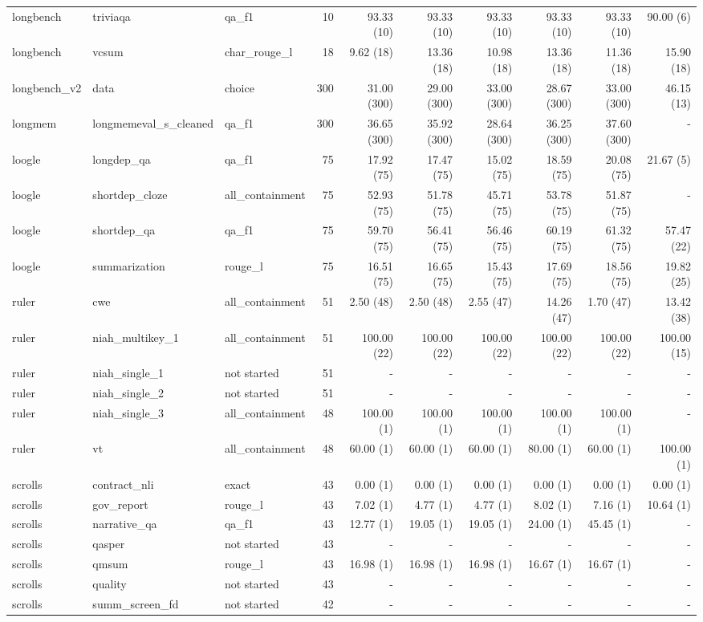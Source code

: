 \begin{landscape}
\begin{longtable}{@{}p{19mm}p{52mm}p{25mm}rrrrrrr@{}}
longbench & triviaqa & qa\_f1 & 10 & 93.33 (10) & 93.33 (10) & 93.33 (10) & 93.33 (10) & 93.33 (10) & 90.00 (6) \\
longbench & vcsum & char\_rouge\_l & 18 & 9.62 (18) & 13.36 (18) & 10.98 (18) & 13.36 (18) & 11.36 (18) & 15.90 (18) \\
longbench\_v2 & data & choice & 300 & 31.00 (300) & 29.00 (300) & 33.00 (300) & 28.67 (300) & 33.00 (300) & 46.15 (13) \\
longmem & longmemeval\_s\_cleaned & qa\_f1 & 300 & 36.65 (300) & 35.92 (300) & 28.64 (300) & 36.25 (300) & 37.60 (300) & - \\
loogle & longdep\_qa & qa\_f1 & 75 & 17.92 (75) & 17.47 (75) & 15.02 (75) & 18.59 (75) & 20.08 (75) & 21.67 (5) \\
loogle & shortdep\_cloze & all\_containment & 75 & 52.93 (75) & 51.78 (75) & 45.71 (75) & 53.78 (75) & 51.87 (75) & - \\
loogle & shortdep\_qa & qa\_f1 & 75 & 59.70 (75) & 56.41 (75) & 56.46 (75) & 60.19 (75) & 61.32 (75) & 57.47 (22) \\
loogle & summarization & rouge\_l & 75 & 16.51 (75) & 16.65 (75) & 15.43 (75) & 17.69 (75) & 18.56 (75) & 19.82 (25) \\
ruler & cwe & all\_containment & 51 & 2.50 (48) & 2.50 (48) & 2.55 (47) & 14.26 (47) & 1.70 (47) & 13.42 (38) \\
ruler & niah\_multikey\_1 & all\_containment & 51 & 100.00 (22) & 100.00 (22) & 100.00 (22) & 100.00 (22) & 100.00 (22) & 100.00 (15) \\
ruler & niah\_single\_1 & not started & 51 & - & - & - & - & - & - \\
ruler & niah\_single\_2 & not started & 51 & - & - & - & - & - & - \\
ruler & niah\_single\_3 & all\_containment & 48 & 100.00 (1) & 100.00 (1) & 100.00 (1) & 100.00 (1) & 100.00 (1) & - \\
ruler & vt & all\_containment & 48 & 60.00 (1) & 60.00 (1) & 60.00 (1) & 80.00 (1) & 60.00 (1) & 100.00 (1) \\
scrolls & contract\_nli & exact & 43 & 0.00 (1) & 0.00 (1) & 0.00 (1) & 0.00 (1) & 0.00 (1) & 0.00 (1) \\
scrolls & gov\_report & rouge\_l & 43 & 7.02 (1) & 4.77 (1) & 4.77 (1) & 8.02 (1) & 7.16 (1) & 10.64 (1) \\
scrolls & narrative\_qa & qa\_f1 & 43 & 12.77 (1) & 19.05 (1) & 19.05 (1) & 24.00 (1) & 45.45 (1) & - \\
scrolls & qasper & not started & 43 & - & - & - & - & - & - \\
scrolls & qmsum & rouge\_l & 43 & 16.98 (1) & 16.98 (1) & 16.98 (1) & 16.67 (1) & 16.67 (1) & - \\
scrolls & quality & not started & 43 & - & - & - & - & - & - \\
scrolls & summ\_screen\_fd & not started & 42 & - & - & - & - & - & - \\
\end{longtable}\endgroup

\end{landscape}
